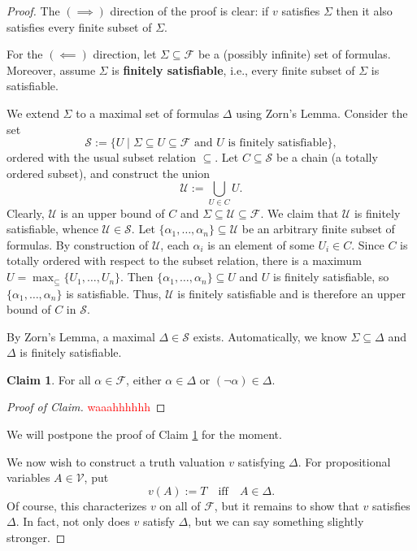 \documentclass[12pt]{article}
\theoremstyle{definition}
\newtheorem{claim}[theorem]{Claim}
\newcommand{\isp}[1]{\quad\text{#1}\quad}
\newcommand{\<}{\langle}
\renewcommand{\>}{\rangle}
\newcommand{\seq}{\subseteq}
\newcommand{\FF}{\mathcal{F}}
\renewcommand{\SS}{\mathcal{S}}
\newcommand{\VV}{\mathcal{V}}
\newcommand{\UU}{\mathcal{U}}
\newcommand{\keyword}{\textbf}
\begin{document}
\begin{proof}
    The $(\implies)$ direction of the proof is clear: if $v$ satisfies $\Sigma$ then it also satisfies every finite subset of $\Sigma$.

    For the $(\impliedby)$ direction, let $\Sigma \seq \FF$ be a (possibly infinite) set of formulas.
    Moreover, assume $\Sigma$ is \keyword{finitely satisfiable}, i.e., every finite subset of $\Sigma$ is satisfiable.

    We extend $\Sigma$ to a maximal set of formulas $\Delta$ using Zorn's Lemma.
    Consider the set
    \[
        \SS := \{U \mid \Sigma \seq U \seq \FF \text{ and $U$ is finitely satisfiable}\},
    \]
    ordered with the usual subset relation $\seq$.
    Let $C \seq \SS$ be a chain (a totally ordered subset), and construct the union
    \[
        \UU := \bigcup_{U \in C} U.
    \]
    Clearly, $\UU$ is an upper bound of $C$ and $\Sigma \seq \UU \seq \FF$.
    We claim that $\UU$ is finitely satisfiable, whence $\UU \in \SS$.
    Let $\{\alpha_1, \dots, \alpha_n\} \seq \UU$ be an arbitrary finite subset of formulas.
    By construction of $\UU$, each $\alpha_i$ is an element of some $U_i \in C$.
    Since $C$ is totally ordered with respect to the subset relation, there is a maximum $U = \max_\seq\{U_1, \dots, U_n\}$.
    Then $\{\alpha_1, \dots, \alpha_n\} \seq U$ and $U$ is finitely satisfiable, so $\{\alpha_1, \dots, \alpha_n\}$ is satisfiable.
    Thus, $\UU$ is finitely satisfiable and is therefore an upper bound of $C$ in $\SS$.

    By Zorn's Lemma, a maximal $\Delta \in \SS$ exists.
    Automatically, we know $\Sigma \seq \Delta$ and $\Delta$ is finitely satisfiable.

    \begin{claim}\label{clm:delta-comp}
        For all $\alpha \in \FF$, either $\alpha \in \Delta$ or $(\lnot\alpha) \in \Delta$.
    \end{claim}

    \begin{proof}[Proof of Claim]
        \textcolor{red}{waaahhhhhh}
    \end{proof}

    We will postpone the proof of Claim \ref{clm:delta-comp} for the moment.

    We now wish to construct a truth valuation $v$ satisfying $\Delta$.
    For propositional variables $A \in \VV$, put
    \[
        v(A) := T \isp{iff} A \in \Delta.
    \]
    Of course, this characterizes $v$ on all of $\FF$, but it remains to show that $v$ satisfies $\Delta$.
    In fact, not only does $v$ satisfy $\Delta$, but we can say something slightly stronger.


\end{proof}
\end{document}
